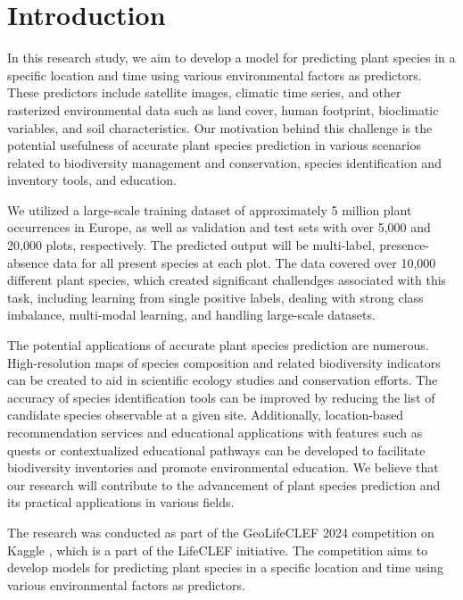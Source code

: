 \section{Introduction}

In this research study, we aim to develop a model for predicting plant species in a specific location and time using various environmental factors as predictors. These predictors include satellite images, climatic time series, and other rasterized environmental data such as land cover, human footprint, bioclimatic variables, and soil characteristics. Our motivation behind this challenge is the potential usefulness of accurate plant species prediction in various scenarios related to biodiversity management and conservation, species identification and inventory tools, and education.

We utilized a large-scale training dataset of approximately 5 million plant occurrences in Europe, as well as validation and test sets with over 5,000 and 20,000 plots, respectively. The predicted output will be multi-label, presence-absence data for all present species at each plot. The data covered over 10,000 different plant species, which created significant challendges associated with this task, including learning from single positive labels, dealing with strong class imbalance, multi-modal learning, and handling large-scale datasets.

The potential applications of accurate plant species prediction are numerous. High-resolution maps of species composition and related biodiversity indicators can be created to aid in scientific ecology studies and conservation efforts. The accuracy of species identification tools can be improved by reducing the list of candidate species observable at a given site. Additionally, location-based recommendation services and educational applications with features such as quests or contextualized educational pathways can be developed to facilitate biodiversity inventories and promote environmental education. We believe that our research will contribute to the advancement of plant species prediction and its practical applications in various fields.

The research was conducted as part of the GeoLifeCLEF 2024 competition on Kaggle \cite{geolifeclef-2024}, which is a part of the LifeCLEF initiative. The competition aims to develop models for predicting plant species in a specific location and time using various environmental factors as predictors.
